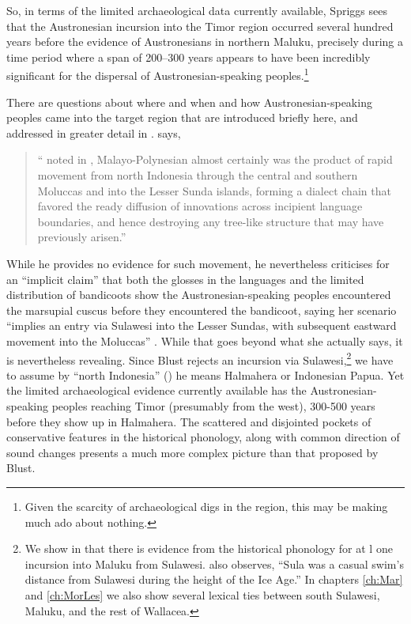 So, in terms of the limited archaeological data currently available,
Spriggs sees that the Austronesian incursion into the
Timor region occurred several hundred years before
the evidence of Austronesians in northern Maluku,
precisely during a time period where a span of
200--300 years appears to have been incredibly significant
for the dispersal of Austronesian-speaking peoples.\footnote{
		Given the scarcity of archaeological digs
		in the region, this may be making much ado about nothing.} 

There are questions about where
and when and how Austronesian-speaking peoples came
into the target region that are introduced briefly
here, and addressed in greater detail in .
\citet[98]{Blust2008} says,

\begin{quote}
		`` noted in \citet{Blust1993},
		 Malayo-Polynesian almost certainly was the product of rapid movement from north Indonesia
		through the central and southern Moluccas and into the Lesser Sunda islands,
		forming a dialect chain that favored the ready diffusion of innovations across incipient language boundaries,
		and hence destroying any tree-like structure that may have previously arisen.'' \citep[98]{Blust2008}
\end{quote}

While he provides no evidence for such movement,
he nevertheless criticises \citet{Schapper2011} for an “implicit claim” that both the glosses in the
languages and the limited distribution of bandicoots show the Austronesian-speaking peoples encountered the marsupial
cuscus before they encountered the bandicoot,
saying her scenario “implies an entry via Sulawesi into the Lesser Sundas,
with subsequent eastward movement into the Moluccas” \citep[274]{Blust2012b}.
While that goes beyond what she actually says,
it is nevertheless revealing.
Since Blust rejects an incursion via Sulawesi,\footnote{
		We show in  that there is evidence
		from the historical phonology for at l one incursion into Maluku from Sulawesi.
		\citet[130]{Bloyd2020} also observes,
		“Sula was a casual swim’s distance from Sulawesi during the height of the Ice Age.”
		In chapters \ref{ch:Mar}
		and \ref{ch:MorLes} we also show several lexical ties between south Sulawesi,
		Maluku, and the rest of Wallacea.}
		we have to assume by “north Indonesia” (\citeyear[98]{Blust2008})
		he means Halmahera or Indonesian Papua.
Yet the limited archaeological evidence currently available has the Austronesian-speaking peoples reaching
Timor (presumably from the west),
300-500 years before they show up in Halmahera.
The scattered and disjointed pockets of conservative features in the historical phonology,
along with common direction of sound changes presents a much more complex picture than that proposed by Blust.

